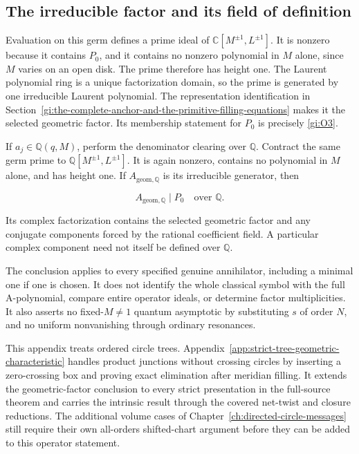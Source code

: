 \subsection{The irreducible factor and its field of definition}\label{gi:the-irreducible-factor-and-its-field-of-definition}

Evaluation on this germ defines a prime ideal of
\(\mathbb C[M^{\pm1},L^{\pm1}]\). It is nonzero because it contains
\(P_0\), and it contains no nonzero polynomial in \(M\) alone,
since \(M\) varies on an open disk. The prime therefore has
height one. The Laurent polynomial ring is a unique factorization
domain, so the prime is generated by one irreducible Laurent
polynomial. The representation identification in Section~\ref{gi:the-complete-anchor-and-the-primitive-filling-equations}
makes it the selected geometric factor. Its membership statement
for \(P_0\) is precisely \eqref{gi:O3}.

If \(a_j\in\mathbb Q(q,M)\), perform the denominator clearing over
\(\mathbb Q\). Contract the same germ prime to
\(\mathbb Q[M^{\pm1},L^{\pm1}]\). It is again nonzero, contains
no polynomial in \(M\) alone, and has height one. If
\(A_{\mathrm{geom},\mathbb Q}\) is its irreducible generator, then

\begin{equation}\label{gi:O18}
A_{\mathrm{geom},\mathbb Q}\mid P_0
                  \quad\text{over }\mathbb Q.
\end{equation}

Its complex factorization contains the selected geometric factor
and any conjugate components forced by the rational coefficient
field. A particular complex component need not itself be defined
over \(\mathbb Q\).

The conclusion applies to every specified genuine annihilator,
including a minimal one if one is chosen. It does not identify
the whole classical symbol with the full A-polynomial, compare
entire operator ideals, or determine factor multiplicities.
It also asserts no fixed-\(M\ne1\) quantum asymptotic by substituting
\(s\) of order \(N\), and no uniform nonvanishing through ordinary
resonances.

This appendix treats ordered circle trees. Appendix~\ref{app:strict-tree-geometric-characteristic} handles product junctions without crossing circles by inserting a zero-crossing box and proving exact elimination after meridian filling. It extends the geometric-factor conclusion to every strict presentation in the full-source theorem and carries the intrinsic result through the covered net-twist and closure reductions. The additional volume cases of Chapter~\ref{ch:directed-circle-messages} still require their own all-orders shifted-chart argument before they can be added to this operator statement.
